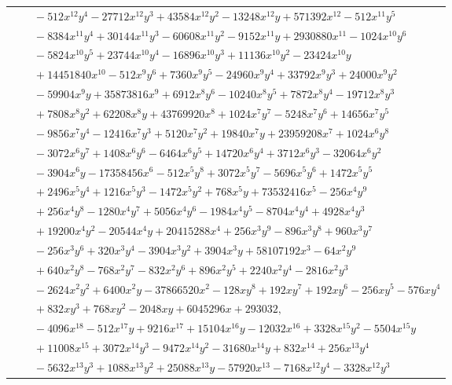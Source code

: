 \documentclass[11pt]{article}
\begin{document}
\begin{longtable}{@{}ll@{}}
 & $\quad -512x^{12}y^{4}-27712x^{12}y^{3}+43584x^{12}y^{2}-13248x^{12}y+571392x^{12}-512x^{11}y^{5}$\\
 & $\quad -8384x^{11}y^{4}+30144x^{11}y^{3}-60608x^{11}y^{2}-9152x^{11}y+2930880x^{11}-1024x^{10}y^{6}$\\
 & $\quad -5824x^{10}y^{5}+23744x^{10}y^{4}-16896x^{10}y^{3}+11136x^{10}y^{2}-23424x^{10}y$\\
 & $\quad +14451840x^{10}-512x^{9}y^{6}+7360x^{9}y^{5}-24960x^{9}y^{4}+33792x^{9}y^{3}+24000x^{9}y^{2}$\\
 & $\quad -59904x^{9}y+35873816x^{9}+6912x^{8}y^{6}-10240x^{8}y^{5}+7872x^{8}y^{4}-19712x^{8}y^{3}$\\
 & $\quad +7808x^{8}y^{2}+62208x^{8}y+43769920x^{8}+1024x^{7}y^{7}-5248x^{7}y^{6}+14656x^{7}y^{5}$\\
 & $\quad -9856x^{7}y^{4}-12416x^{7}y^{3}+5120x^{7}y^{2}+19840x^{7}y+23959208x^{7}+1024x^{6}y^{8}$\\
 & $\quad -3072x^{6}y^{7}+1408x^{6}y^{6}-6464x^{6}y^{5}+14720x^{6}y^{4}+3712x^{6}y^{3}-32064x^{6}y^{2}$\\
 & $\quad -3904x^{6}y-17358456x^{6}-512x^{5}y^{8}+3072x^{5}y^{7}-5696x^{5}y^{6}+1472x^{5}y^{5}$\\
 & $\quad +2496x^{5}y^{4}+1216x^{5}y^{3}-1472x^{5}y^{2}+768x^{5}y+73532416x^{5}-256x^{4}y^{9}$\\
 & $\quad +256x^{4}y^{8}-1280x^{4}y^{7}+5056x^{4}y^{6}-1984x^{4}y^{5}-8704x^{4}y^{4}+4928x^{4}y^{3}$\\
 & $\quad +19200x^{4}y^{2}-20544x^{4}y+20415288x^{4}+256x^{3}y^{9}-896x^{3}y^{8}+960x^{3}y^{7}$\\
 & $\quad -256x^{3}y^{6}+320x^{3}y^{4}-3904x^{3}y^{2}+3904x^{3}y+58107192x^{3}-64x^{2}y^{9}$\\
 & $\quad +640x^{2}y^{8}-768x^{2}y^{7}-832x^{2}y^{6}+896x^{2}y^{5}+2240x^{2}y^{4}-2816x^{2}y^{3}$\\
 & $\quad -2624x^{2}y^{2}+6400x^{2}y-37866520x^{2}-128xy^{8}+192xy^{7}+192xy^{6}-256xy^{5}-576xy^{4}$\\
 & $\quad +832xy^{3}+768xy^{2}-2048xy+6045296x+293032,$\\
 & $\quad -4096x^{18}-512x^{17}y+9216x^{17}+15104x^{16}y-12032x^{16}+3328x^{15}y^{2}-5504x^{15}y$\\
 & $\quad +11008x^{15}+3072x^{14}y^{3}-9472x^{14}y^{2}-31680x^{14}y+832x^{14}+256x^{13}y^{4}$\\
 & $\quad -5632x^{13}y^{3}+1088x^{13}y^{2}+25088x^{13}y-57920x^{13}-7168x^{12}y^{4}-3328x^{12}y^{3}$\\

\end{longtable}
\end{document}
